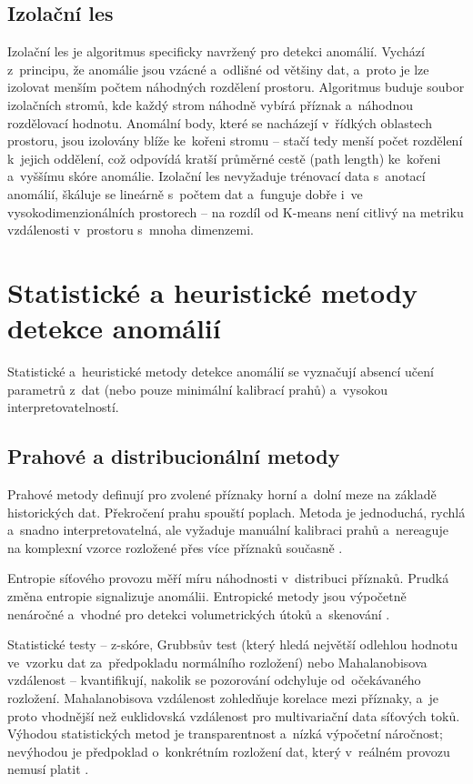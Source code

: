 \subsection{Izolační les}
\label{sec:isolation-forest}

Izolační les \parencite{Liu2008} je algoritmus specificky navržený pro detekci anomálií. Vychází z~principu, že anomálie jsou vzácné a~odlišné od většiny dat, a~proto je lze izolovat menším počtem náhodných rozdělení prostoru. Algoritmus buduje soubor izolačních stromů, kde každý strom náhodně vybírá příznak a~náhodnou rozdělovací hodnotu. Anomální body, které se nacházejí v~řídkých oblastech prostoru, jsou izolovány blíže ke~kořeni stromu -- stačí tedy menší počet rozdělení k~jejich oddělení, což odpovídá kratší průměrné cestě (path length) ke~kořeni a~vyššímu skóre anomálie. Izolační les nevyžaduje trénovací data s~anotací anomálií, škáluje se lineárně s~počtem dat a~funguje dobře i~ve vysokodimenzionálních prostorech -- na rozdíl od K-means není citlivý na metriku vzdálenosti v~prostoru s~mnoha dimenzemi.

\section{Statistické a heuristické metody detekce anomálií}
\label{sec:stat-metody}

Statistické a~heuristické metody detekce anomálií se vyznačují absencí učení parametrů z~dat (nebo pouze minimální kalibrací prahů) a~vysokou interpretovatelností.

\subsection{Prahové a distribucionální metody}
\label{sec:stat-detekce}

Prahové metody definují pro zvolené příznaky horní a~dolní meze na základě historických dat. Překročení prahu spouští poplach. Metoda je jednoduchá, rychlá a~snadno interpretovatelná, ale vyžaduje manuální kalibraci prahů a~nereaguje na komplexní vzorce rozložené přes více příznaků současně \parencite{Dutta2022}.

Entropie síťového provozu měří míru náhodnosti v~distribuci příznaků. Prudká změna entropie signalizuje anomálii. Entropické metody jsou výpočetně nenáročné a~vhodné pro detekci volumetrických útoků a~skenování \parencite{OzkanOkay2021}.

Statistické testy -- z-skóre, Grubbsův test (který hledá největší odlehlou hodnotu ve~vzorku dat za~předpokladu normálního rozložení) nebo Mahalanobisova vzdálenost -- kvantifikují, nakolik se pozorování odchyluje od~očekávaného rozložení. Mahalanobisova vzdálenost zohledňuje korelace mezi příznaky, a~je proto vhodnější než euklidovská vzdálenost pro multivariační data síťových toků. Výhodou statistických metod je transparentnost a~nízká výpočetní náročnost; nevýhodou je předpoklad o~konkrétním rozložení dat, který v~reálném provozu nemusí platit \parencite{Dutta2022}.

